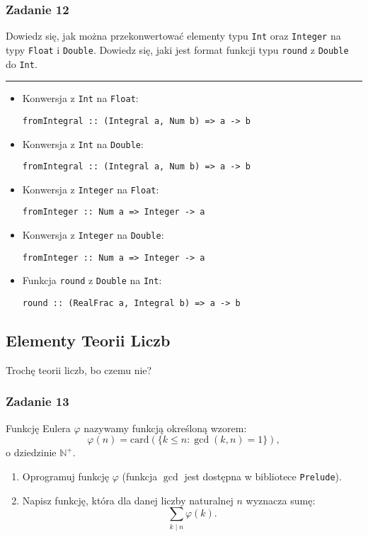 \documentclass[11pt,a4paper]{article}
\begin{document}
\subsubsection{Zadanie 12}
Dowiedz się, jak można przekonwertować elementy typu \texttt{Int} oraz \texttt{Integer} na typy \texttt{Float} i \texttt{Double}. Dowiedz się, jaki jest format funkcji typu \texttt{round} z \texttt{Double} do \texttt{Int}.

\bigskip
\hrule
\bigskip

\begin{itemize}
    \item Konwersja z \texttt{Int} na \texttt{Float}:
        \begin{Verbatim}[frame=single]
fromIntegral :: (Integral a, Num b) => a -> b
        \end{Verbatim}
    \item Konwersja z \texttt{Int} na \texttt{Double}:
        \begin{Verbatim}[frame=single]
fromIntegral :: (Integral a, Num b) => a -> b
        \end{Verbatim}
    \item Konwersja z \texttt{Integer} na \texttt{Float}:
        \begin{Verbatim}[frame=single]
fromInteger :: Num a => Integer -> a
        \end{Verbatim}
    \item Konwersja z \texttt{Integer} na \texttt{Double}:
        \begin{Verbatim}[frame=single]
fromInteger :: Num a => Integer -> a
        \end{Verbatim}
    \item Funkcja \texttt{round} z \texttt{Double} na \texttt{Int}:
        \begin{Verbatim}[frame=single]
round :: (RealFrac a, Integral b) => a -> b
        \end{Verbatim}
\end{itemize}

\subsection{Elementy Teorii Liczb}
Trochę teorii liczb, bo czemu nie?
\subsubsection{Zadanie 13}
Funkcję Eulera \(\varphi\) nazywamy funkcją określoną wzorem:
\begin{equation}
    \varphi(n) = \text{card}\left(\{k \leq n : \gcd(k, n) = 1\}\right),
\end{equation}
o dziedzinie \(\mathbb{N}^+\).
\begin{enumerate}
    \item Oprogramuj funkcję \(\varphi\) (funkcja \(\gcd\) jest dostępna w bibliotece \texttt{Prelude}).
    \item Napisz funkcję, która dla danej liczby naturalnej \(n\) wyznacza sumę:
        \[
            \sum_{k \mid n} \varphi(k).
        \]
\end{enumerate}
\end{document}
